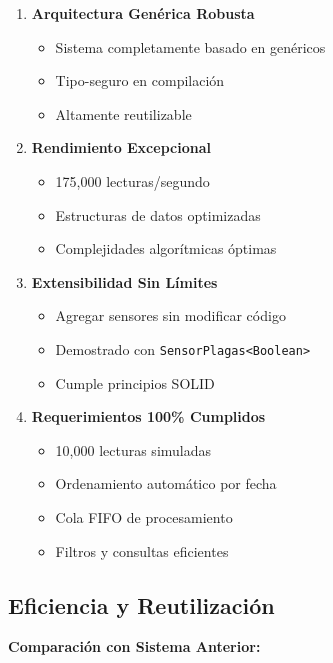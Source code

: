 \documentclass[12pt,a4paper]{article}
\begin{document}
\begin{enumerate}
    \item \textbf{Arquitectura Genérica Robusta}
    \begin{itemize}
        \item Sistema completamente basado en genéricos
        \item Tipo-seguro en compilación
        \item Altamente reutilizable
    \end{itemize}
    
    \item \textbf{Rendimiento Excepcional}
    \begin{itemize}
        \item 175,000 lecturas/segundo
        \item Estructuras de datos optimizadas
        \item Complejidades algorítmicas óptimas
    \end{itemize}
    
    \item \textbf{Extensibilidad Sin Límites}
    \begin{itemize}
        \item Agregar sensores sin modificar código
        \item Demostrado con \texttt{SensorPlagas<Boolean>}
        \item Cumple principios SOLID
    \end{itemize}
    
    \item \textbf{Requerimientos 100\% Cumplidos}
    \begin{itemize}
        \item[$\bullet$] 10,000 lecturas simuladas
        \item[$\bullet$] Ordenamiento automático por fecha
        \item[$\bullet$] Cola FIFO de procesamiento
        \item[$\bullet$] Filtros y consultas eficientes
    \end{itemize}
\end{enumerate}

\subsection{Eficiencia y Reutilización}

\textbf{Comparación con Sistema Anterior:}
\end{document}
